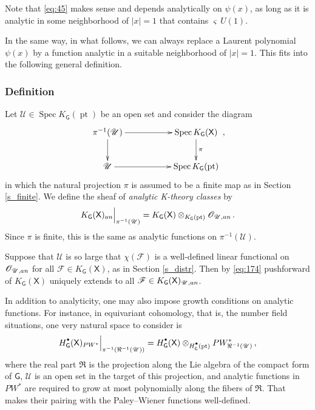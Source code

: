 \documentclass[14pt]{extarticle}
\newcommand{\bG}{\mathsf{G}}
\newcommand{\bX}{\mathsf{X}}
\newcommand{\cU}{\mathscr{U}}
\newcommand{\cF}{\mathscr{F}}
\newcommand{\cO}{\mathscr{O}}
\newcommand{\Hd}{{H}^{\raisebox{0.5mm}{$\scriptscriptstyle \bullet$}}}
\newcommand{\an}{\textup{an}}
\DeclareMathOperator{\pt}{pt}
\DeclareMathOperator{\Spec}{Spec}
\theoremstyle{definition}
\begin{document}
\subsubsection{}

Note that \eqref{eq:45} makes sense and depends analytically on
$\psi(x)$, as long as it is analytic in some neighborhood of $|x|=1$ that
contains $\varsigma \, U(1)$.

In the same way, in what follows, we can always replace a Laurent
polynomial $\psi(x)$ by a function analytic in a suitable neighborhood
of $|x|=1$. This fits into the following general definition. 

\subsubsection{Definition}\label{s_K_an} 

Let $\cU \in \Spec K_\bG(\pt)$ be an open set and consider
the diagram
%
\begin{equation}
  \label{eq:172}
  \xymatrix{
    \pi^{-1}(\cU) \ar[rr] \ar[d] && \Spec K_\bG(\bX) \ar[d]^\pi \\
    \cU  \ar[rr] && \Spec K_\bG(\pt)
    }\,, 
\end{equation}
%
in which the natural projection $\pi$ is assumed to be
a finite map as in Section \ref{s_finite}. We define the sheaf of 
\emph{analytic K-theory classes} by
%
\begin{equation}
K_\bG(\bX)_{\an} \Big|_{\pi^{-1}(\cU)}= K_\bG(\bX) \otimes_{ K_\bG(\pt)}
\cO_{\cU,\an} \,. \label{eq:174}
\end{equation}
%
Since $\pi$ is finite, this is the same as analytic functions on
$\pi^{-1}(\cU)$.

Suppose that $\cU$ is so large that  $\chi(\cF)$ is a well-defined linear functional
on $\cO_{\cU,\an}$ for all $\cF \in K_\bG(\bX)$, as in Section
\ref{s_distr}. 
Then by \eqref{eq:174} pushforward of
$K_\bG(\bX)$ uniquely extends to 
all $\cF\in K_\bG(\bX)_{\cU,\an}$.

In addition to analyticity, one may also impose growth conditions on
analytic functions. For instance, in equivariant cohomology, that is,
the number field situations, one very natural
space to consider is
%
\begin{equation}
  \label{eq:177}
  \Hd_\bG(\bX)_{PW^*} \Big|_{\pi^{-1}(\Re^{-1}(\cU))}= \Hd_\bG(\bX) \otimes_{\Hd_\bG(\pt)}
PW^*_{\Re^{-1}(\cU)} \,, 
\end{equation}
%
where the real part $\Re$ is the projection along the Lie algebra of the
compact form of $\bG$, $\cU$ is an open set in the target of this
projection, and analytic functions in $PW^*$ are required
to grow at most polynomially along the fibers of $\Re$. That makes
their pairing with the Paley--Wiener functions
well-defined.
\end{document}
